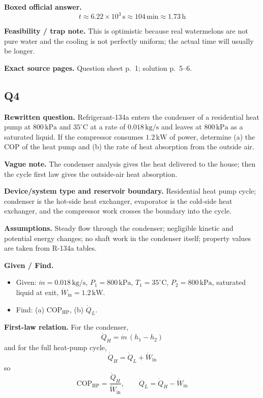 \textbf{Boxed official answer.}
\[
\boxed{t \approx 6.22\times 10^3\,\text{s} \approx 104\,\text{min} \approx 1.73\,\text{h}}
\]

\textbf{Feasibility / trap note.} This is optimistic because real watermelons are not pure water and the cooling is not perfectly uniform; the actual time will usually be longer.

\textbf{Exact source pages.} Question sheet p.~1; solution p.~5--6.

\subsection*{Q4}
\textbf{Rewritten question.} Refrigerant-134a enters the condenser of a residential heat pump at $800\,\text{kPa}$ and $35^\circ\text{C}$ at a rate of $0.018\,\text{kg/s}$ and leaves at $800\,\text{kPa}$ as a saturated liquid. If the compressor consumes $1.2\,\text{kW}$ of power, determine (a) the COP of the heat pump and (b) the rate of heat absorption from the outside air.

\textbf{Vague note.} The condenser analysis gives the heat delivered to the house; then the cycle first law gives the outside-air heat absorption.

\textbf{Device/system type and reservoir boundary.} Residential heat pump cycle; condenser is the hot-side heat exchanger, evaporator is the cold-side heat exchanger, and the compressor work crosses the boundary into the cycle.

\textbf{Assumptions.} Steady flow through the condenser; negligible kinetic and potential energy changes; no shaft work in the condenser itself; property values are taken from R-134a tables.

\textbf{Given / Find.}
\begin{itemize}
  \item Given: $\dot m=0.018\,\text{kg/s}$, $P_1=800\,\text{kPa}$, $T_1=35^\circ\text{C}$, $P_2=800\,\text{kPa}$, saturated liquid at exit, $\dot W_{\text{in}}=1.2\,\text{kW}$.
  \item Find: (a) $\mathrm{COP}_{\mathrm{HP}}$, (b) $\dot Q_L$.
\end{itemize}

\textbf{First-law relation.}
For the condenser,
\[
\dot Q_H = \dot m\,(h_1-h_2)
\]
and for the full heat-pump cycle,
\[
\dot Q_H = \dot Q_L + \dot W_{\text{in}}
\]
so
\[
\mathrm{COP}_{\mathrm{HP}} = \frac{\dot Q_H}{\dot W_{\text{in}}},
\qquad
\dot Q_L = \dot Q_H - \dot W_{\text{in}}
\]

